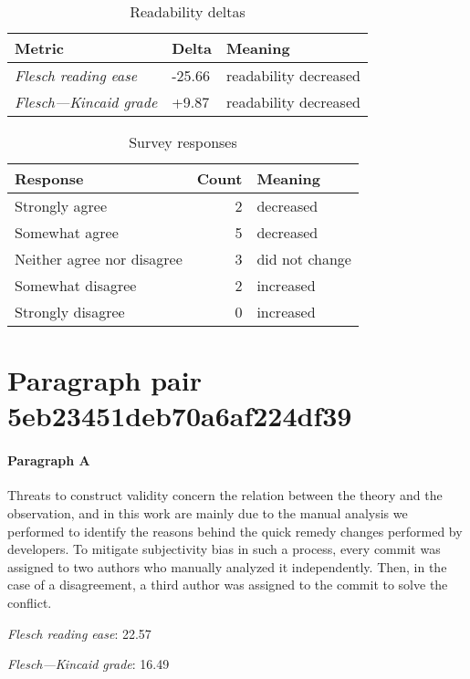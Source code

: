 \bigskip\begin{table}[!h]
\centering
\begin{tabular}{lll}
\toprule
               \textbf{Metric} & \textbf{Delta} &       \textbf{Meaning} \\
\midrule
    \emph{Flesch reading ease} &         -25.66 &  readability decreased \\
 \emph{Flesch---Kincaid grade} &          +9.87 &  readability decreased \\
\bottomrule
\end{tabular}
\caption*{Readability deltas}\end{table}

\begin{table}[!h]
\centering
\begin{tabular}{lrl}
\toprule
          \textbf{Response} &  \textbf{Count} & \textbf{Meaning} \\
\midrule
             Strongly agree &               2 &        decreased \\
             Somewhat agree &               5 &        decreased \\
 Neither agree nor disagree &               3 &   did not change \\
          Somewhat disagree &               2 &        increased \\
          Strongly disagree &               0 &        increased \\
\bottomrule
\end{tabular}
\caption*{Survey responses}\end{table}


\newpage
\section{Paragraph pair 5eb23451deb70a6af224df39}
\paragraph{Paragraph A}
Threats to construct validity concern the relation between the theory and the observation, and in this work are mainly due to the manual analysis we performed to identify the reasons behind the quick remedy changes performed by developers. To mitigate subjectivity bias in such a process, every commit was assigned to two authors who manually analyzed it independently. Then, in the case of a disagreement, a third author was assigned to the commit to solve the conflict.\par\medskip
\emph{Flesch reading ease}: 22.57\par
\emph{Flesch---Kincaid grade}: 16.49

